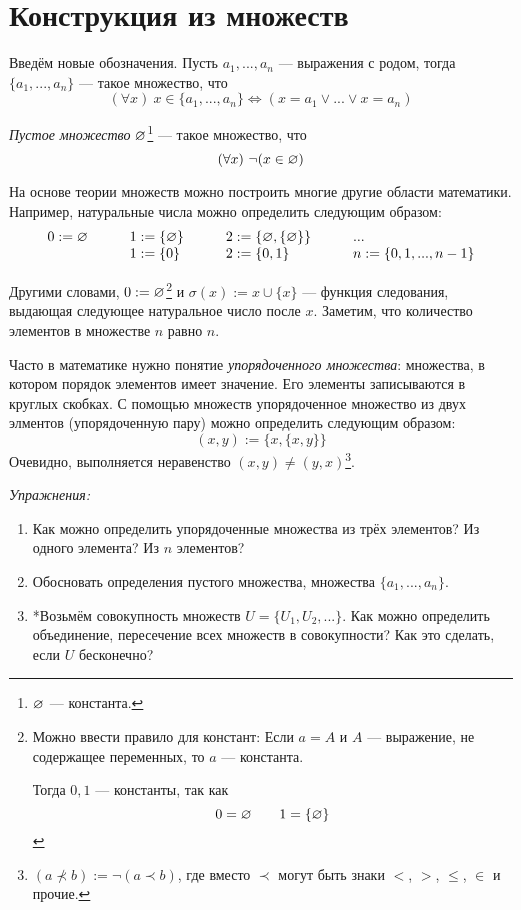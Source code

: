 \section{Конструкция из множеств}

Введём новые обозначения. Пусть $a_1,...,a_{n}$ --- выражения с родом,
тогда $\{a_{1},...,a_{n}\}$ --- такое множество, что
\[
	(\forall x)~x\in \{a_1,...,a_{n}\}\iff (x=a_1\lor...\lor x=a_{n})
\]

{\it Пустое множество} $\varnothing$\footnote{
	$\varnothing$ --- константа.
} --- такое множество, что
\[
	(\forall x)~\lnot(x\in \varnothing)
\]

На основе теории множеств можно построить многие другие области математики.
Например, натуральные числа можно определить следующим образом:
\[
	\begin{array}{llll}
		0  :=\varnothing\qquad & 1  :=\{\varnothing\}\qquad & 2  :=\{\varnothing,\{\varnothing\}\}\qquad & ... \\
		                 & 1:=\{0\}\qquad       & 2:=\{0,1\}
		                 & n:=\{0,1,...,n-1\}
	\end{array}
\]

Другими словами, ${0:=\varnothing}$\footnote{
	Можно ввести правило для констант:
	Если $a=A$ и $A$ --- выражение, не содержащее переменных, то $a$ --- константа.

	Тогда $0,1$ --- константы, так как
	\[
		0=\varnothing\qquad 1=\{\varnothing\}
	\]
} и $\sigma(x):=x\cup \{x\}$ --- функция следования,
выдающая следующее натуральное число после $x$. Заметим, что количество элементов
в множестве $n$ равно $n$.

Часто в математике нужно понятие {\it упорядоченного множества}:
множества, в котором порядок элементов имеет значение. Его элементы записываются
в круглых скобках. С помощью множеств упорядоченное множество из двух
элментов (упорядоченную пару) можно определить следующим образом:
\[
	(x,y):=\{x,\{x,y\}\}
\]
Очевидно, выполняется неравенство $(x,y)\neq (y,x)$\footnote{
	$(a\nprec b):=\lnot(a\prec b)$, где вместо $\prec$ могут быть знаки
	$<$, $>$, $\leq$, $\in$ и прочие.
}.

\vspace{1em}
{\it Упражнения:}
\begin{enumerate}
	\item{}Как можно определить упорядоченные множества из трёх элементов?
	Из одного элемента? Из $n$ элементов?

	\item{}Обосновать определения пустого множества, множества $\{a_1,...,a_{n}\}$.

	\item{}*Возьмём совокупность множеств $U=\{U_{1},U_{2},...\}$.
	Как можно определить объединение, пересечение всех множеств в совокупности?
	Как это сделать, если $U$ бесконечно?
\end{enumerate}

\pagebreak
